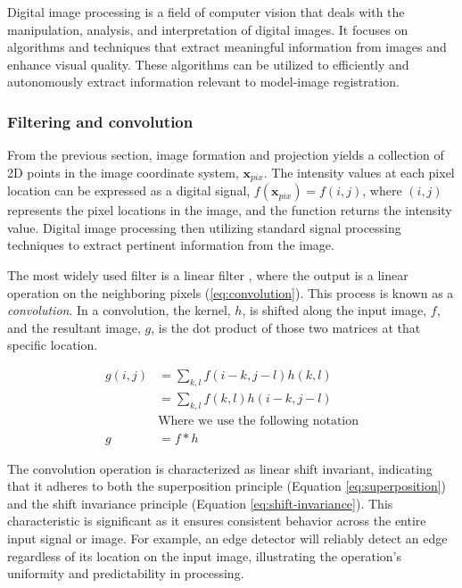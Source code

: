 Digital image processing is a field of computer vision that deals with the manipulation, analysis, and interpretation of digital images.
It focuses on algorithms and techniques that extract meaningful information from images and enhance visual quality.
These algorithms can be utilized to efficiently and autonomously extract information relevant to model-image registration.

\subsubsection{Filtering and convolution}
\label{sec:filtering-convolution}
From the previous section, image formation and projection yields a collection of 2D points in the image coordinate system, $\mathbf{x}_{pix}$.
The intensity values at each pixel location can be expressed as a digital signal, $f(\mathbf{x}_{pix}) = f(i,j)$, where $(i,j)$ represents the pixel locations in the image, and the function returns the intensity value.
Digital image processing then utilizing standard signal processing techniques to extract pertinent information from the image.

The most widely used filter is a linear filter \cite{szeliskiComputerVisionAlgorithms2022}, where the output is a linear operation on the neighboring pixels (\cref{eq:convolution}).
This process is known as a \emph{convolution}.
In a convolution, the kernel, $h$, is shifted along the input image, $f$, and the resultant image, $g$, is the dot product of those two matrices at that specific location.

\begin{equation}
    \begin{aligned}
        g(i,j) &= \sum_{k,l}f(i-k,j-l)h(k,l) \\
        &= \sum_{k,l}f(k,l)h(i-k,j-l) \\
        &\text{Where we use the following notation}\\
        g&= f * h
    \end{aligned}
    \label{eq:convolution}
\end{equation}

The convolution operation is characterized as linear shift invariant, indicating that it adheres to both the superposition principle (Equation \ref{eq:superposition}) and the shift invariance principle (Equation \ref{eq:shift-invariance}).
This characteristic is significant as it ensures consistent behavior across the entire input signal or image.
For example, an edge detector will reliably detect an edge regardless of its location on the input image, illustrating the operation's uniformity and predictability in processing.

